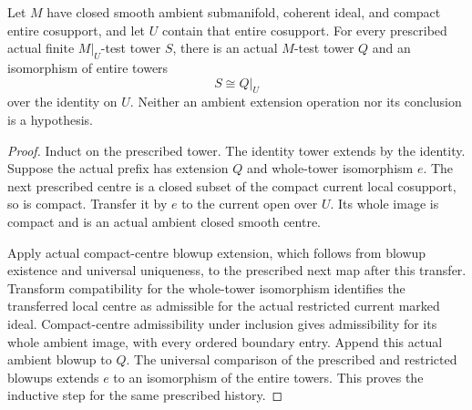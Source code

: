 \begin{lemma}
\label{hir:original-old-branch-lowdep-compact-extension}
\leanok
Let $M$ have closed smooth ambient submanifold, coherent ideal, and
compact entire cosupport, and let $U$ contain that entire cosupport.
For every prescribed actual finite $M|_U$-test tower $S$, there is an
actual $M$-test tower $Q$ and an isomorphism of entire towers
\[
 S\cong Q|_U
\]
over the identity on $U$. Neither an ambient extension operation nor
its conclusion is a hypothesis.
\end{lemma}
\begin{proof}
Induct on the prescribed tower. The identity tower extends by the
identity. Suppose the actual prefix has extension $Q$ and whole-tower
isomorphism $e$. The next prescribed centre is a closed subset of the
compact current local cosupport, so is compact. Transfer it by $e$
to the current open over $U$. Its whole image is compact and is an
actual ambient closed smooth centre.

Apply actual compact-centre blowup extension, which follows from
blowup existence and universal uniqueness, to the prescribed next
map after this transfer. Transform compatibility for the whole-tower
isomorphism identifies the transferred local centre as admissible for
the actual restricted current marked ideal. Compact-centre
admissibility under inclusion gives admissibility for its whole ambient
image, with every ordered boundary entry. Append this actual ambient
blowup to $Q$. The universal comparison of the prescribed and restricted
blowups extends $e$ to an isomorphism of the entire towers. This proves
the inductive step for the same prescribed history.
\end{proof}

